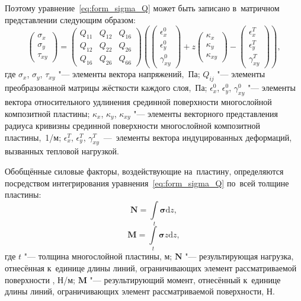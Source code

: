 Поэтому уравнение~\eqref{eq:form_sigma_Q} может быть записано в~матричном
представлении следующим образом:
\[
\begin{pmatrix}
\sigma_{x}\\
\sigma_{y}\\
\tau_{xy}
\end{pmatrix}
=
\begin{pmatrix}
Q_{11} & Q_{12} & Q_{16}\\
Q_{12} & Q_{22} & Q_{26}\\
Q_{16} & Q_{26} & Q_{66}
\end{pmatrix}
\left(
    \begin{pmatrix}
    \epsilon_{x}^0\\
    \epsilon_{y}^0\\
    \gamma_{xy}^0
    \end{pmatrix}
+ z
    \begin{pmatrix}
    \kappa_{x}\\
    \kappa_{y}\\
    \kappa_{xy}
    \end{pmatrix}
-
    \begin{pmatrix}
    \epsilon_{x}^T\\
    \epsilon_{y}^T\\
    \gamma_{xy}^T
    \end{pmatrix}
\right)\!\!,
\]
где $\sigma_{x}$,  $\sigma_{y}$,  $\tau_{xy}$ "--- элементы вектора напряжений,~Па;
$Q_{ij}$ "--- элементы преобразованной матрицы жёсткости каждого слоя,~Па;
$\epsilon_{x}^0$, $\epsilon_{y}^0$, $\gamma_{xy}^0$ "--- элементы вектора относительного удлинения срединной поверхности многослойной композитной пластины;
$\kappa_{x}$, $\kappa_{y}$, $\kappa_{xy}$ "--- элементы векторного представления радиуса кривизны срединной поверхности многослойной композитной пластины,~1/м;
$\epsilon_{x}^T$, $\epsilon_{y}^T$, $\gamma_{xy}^T$~---~элементы вектора индуцированных деформаций, вызванных тепловой нагрузкой.

\begingroup%
Обобщённые силовые факторы, воздействующие на~пластину, определяются посредством интегрирования уравнения~\eqref{eq:form_sigma_Q} по~всей толщине пластины:\russianpar
\endgroup%
\[
\mathbf{N} = \int\limits_t \boldsymbol{\sigma} \mathrm{d}z,
\]
\[
\mathbf{M} = \int\limits_t \boldsymbol{\sigma} z \mathrm{d}z,
\]
где $t$ "--- толщина многослойной пластины, м;
$ \mathbf{N} $ "--- результирующая нагрузка, отнесённая к~единице длины линий, ограничивающих элемент рассматриваемой поверхности \cites[69]{Vasiljev1988_Meh_konstr_kompozit}, \mbox{Н/м};
$ \mathbf{M} $ "--- результирующий момент, отнесённый к~единице длины линий, ограничивающих элемент рассматриваемой поверхности, Н.

